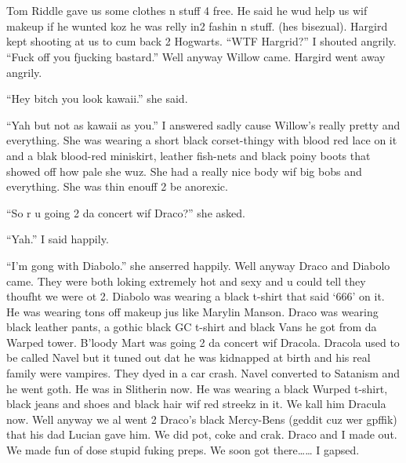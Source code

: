 \section{}



Tom Riddle gave us some clothes n stuff 4 free. He said he wud help us wif makeup if he wunted koz he was relly in2 fashin n stuff. (hes bisezual). Hargird kept shooting at us to cum back 2 Hogwarts. \enquote{WTF Hargrid?} I shouted angrily. \enquote{Fuck off you fjucking bastard.} Well anyway Willow came. Hargird went away angrily.

\enquote{Hey bitch you look kawaii.} she said.

\enquote{Yah but not as kawaii as you.} I answered sadly cause Willow's really pretty and everything. She was wearing a short black corset-thingy with blood red lace on it and a blak blood-red miniskirt, leather fish-nets and black poiny boots that showed off how pale she wuz. She had a really nice body wif big bobs and everything. She was thin enouff 2 be anorexic.

\enquote{So r u going 2 da concert wif Draco?} she asked.

\enquote{Yah.} I said happily.

\enquote{I'm gong with Diabolo.} she anserred happily. Well anyway Draco and Diabolo came. They were both loking extremely hot and sexy and u could tell they thoufht we were ot 2. Diabolo was wearing a black t-shirt that said \enquote*{666} on it. He was wearing tons off makeup jus like Marylin Manson. Draco was wearing black leather pants, a gothic black GC t-shirt and black Vans he got from da Warped tower. B'loody Mart was going 2 da concert wif Dracola. Dracola used to be called Navel but it tuned out dat he was kidnapped at birth and his real family were vampires. They dyed in a car crash. Navel converted to Satanism and he went goth. He was in Slitherin now. He was wearing a black Wurped t-shirt, black jeans and shoes and black hair wif red streekz in it. We kall him Dracula now. Well anyway we al went 2 Draco's black Mercy-Bens (geddit cuz wer gpffik) that his dad Lucian gave him. We did pot, coke and crak. Draco and I made out. We made fun of dose stupid fuking preps. We soon got there\ldots{}\ldots{} I gapsed.

